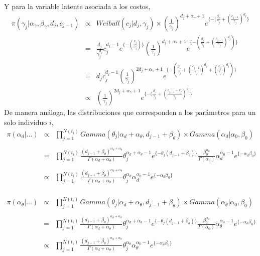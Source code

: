 Y para la variable latente asociada a los costos,
\begin{eqnarray*}
\pi(\gamma_j|\alpha_\gamma,\beta_\gamma,d_j,c_{j-1})&\propto& Weibull(c_j|d_j,\gamma_j)\times (\frac{1}{\gamma_j})^{d_j +\alpha_\gamma+1}e^{\{-(\frac{\beta_\gamma}{\gamma_j}+(\frac{c_{j-1}}{\gamma_j})^{d_j}\}}\\
&=&\frac{d_j}{\gamma_j^{d_j}}c_j^{d_j-1}e^{\{-(\frac{c_j}{\gamma_j})\}}(\frac{1}{\gamma_j})^{d_j+\alpha_\gamma+1}e^{\{-(\frac{\beta_\gamma}{\gamma_j}+(\frac{c_{j-1}}{\gamma_j})^{d_j})\}}\\
&=&d_j c_j^{d_j-1}(\frac{1}{\gamma_j})^{2d_j+\alpha_\gamma+1}e^{\{-(\frac{\beta_\gamma}{\gamma_j}+(\frac{c_{j-1}}{\gamma_j})^{d_j}+(\frac{c_j}{\gamma_j})^{d_j})\}}\\
&\propto&(\frac{1}{\gamma_j})^{2d_j+\alpha_\gamma+1}e^{\{-(\frac{\beta_\gamma}{\gamma_j}+(\frac{c_{j-1}+c_j}{\gamma_j})^{d_j}\}}
\end{eqnarray*}
De manera an\'aloga, las distribuciones que corresponden a los par\'ametros para un solo individuo $i$,
\begin{eqnarray*}
\pi(\alpha_d|...)&\propto& \prod_{j=1}^{N(t_i)} Gamma(\theta_j|\alpha_d+\alpha_\theta,d_{j-1}+\beta_\theta)\times Gamma(\alpha_d|\alpha_0,\beta_0)\\
\\
&=&\prod_{j=1}^{N(t_i)}\frac{(d_{j-1}+\beta_\theta)^{\alpha_d+\alpha_\theta}}{\Gamma(\alpha_d+\alpha_\theta)} \theta_j^{\alpha_d+\alpha_\theta-1} e^{\{-\theta_j(d_{j-1}+\beta_\theta)\}}\frac{\beta_0^{\alpha_0}}{\Gamma(\alpha_0)} \alpha_d^{\alpha_0-1}e^{\{-\alpha_d\beta_0\}}\\
\\
&\propto&\prod_{j=1}^{N(t_i)}\frac{(d_{j-1}+\beta_\theta)^{\alpha_d+\alpha_\theta}}{\Gamma(\alpha_d+\alpha_\theta)} \theta_j^{\alpha_d}\alpha_d^{\alpha_0-1}e^{\{-\alpha_d\beta_0\}}
\end{eqnarray*}
\\
\begin{eqnarray*}
\pi(\alpha_\theta|...)&\propto&\prod_{j=1}^{N(t_i)} Gamma(\theta_j|\alpha_d+\alpha_\theta,d_{j-1}+\beta_\theta)\times Gamma(\alpha_\theta|\alpha_0,\beta_0)\\
\\
&=&\prod_{j=1}^{N(t_i)}\frac{(d_{j-1}+\beta_\theta)^{\alpha_d+\alpha_\theta}}{\Gamma(\alpha_d+\alpha_\theta)} \theta_j^{\alpha_d+\alpha_\theta-1} e^{\{-\theta_j(d_{j-1}+\beta_\theta)\}}\frac{\beta_0^{\alpha_0}}{\Gamma(\alpha_0)} \alpha_\theta^{\alpha_0-1}e^{\{-\alpha_\theta\beta_0\}}\\
\\
&\propto& \prod_{j=1}^{N(t_i)}\frac{(d_{j-1}+\beta_\theta)^{\alpha_d+\alpha_\theta}}{\Gamma(\alpha_d+\alpha_\theta)} \theta_j^{\alpha_\theta}\alpha_\theta^{\alpha_0-1}e^{\{-\alpha_\theta\beta_0\}}
\end{eqnarray*}

